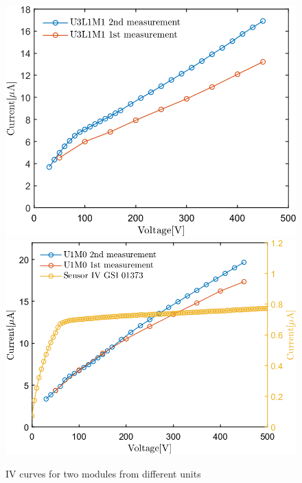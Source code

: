 \begin{figure}[h!]
\centering
\includegraphics[width=0.5\columnwidth]{Chapter6/DCS/images/IV/U3L1FEB3.png}
\includegraphics[width=0.55\columnwidth]{Chapter6/DCS/images/IV/U1FEB1.png}
\caption{IV curves for two modules from different units}
\label{fig_U1FEB1}
\end{figure}
